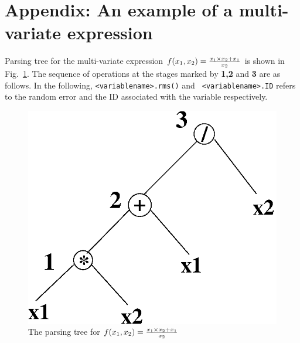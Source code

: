 \documentclass[acmtoms,acmnow]{acmtrans2m}
\begin{document}
\section{Appendix: An example of a multi-variate expression}
\label{APPEN:EX}
Parsing tree for the multi-variate expression $f(x_1,x_2)={x_1\times
x_2+x_1 \over {x_2}}$ is shown in Fig.~\ref{EX2}.  The sequence of
operations at the stages marked by {\bf 1,2} and {\bf 3} are as
follows.  In the following, {\tt <variablename>.rms()} and {\tt
<variablename>.ID} refers to the random error and the ID associated
with the variable respectively.
\begin{figure}[t]
\begin{center}
  \includegraphics[scale=0.45]{Figs/fig2.ps}
\caption[]{The parsing tree for $f(x_1,x_2)={x_1\times x_2+x_1 \over {x_2}}$}
\label{EX2}
\end{center}
\end{figure}
\end{document}
